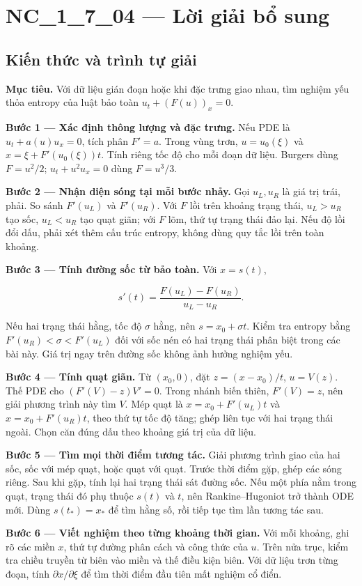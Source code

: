 \documentclass[10pt,a4paper]{article}
\begin{document}
\section*{NC\_1\_7\_04 — Lời giải bổ sung}
\subsection*{Kiến thức và trình tự giải}
\textbf{Mục tiêu.} Với dữ liệu gián đoạn hoặc khi đặc trưng giao nhau, tìm nghiệm yếu thỏa entropy của luật bảo toàn $u_t+(F(u))_x=0$.

\textbf{Bước 1 — Xác định thông lượng và đặc trưng.} Nếu PDE là $u_t+a(u)u_x=0$, tích phân $F'=a$. Trong vùng trơn, $u=u_0(\xi)$ và $x=\xi+F'(u_0(\xi))t$. Tính riêng tốc độ cho mỗi đoạn dữ liệu. Burgers dùng $F=u^2/2$; $u_t+u^2u_x=0$ dùng $F=u^3/3$.

\textbf{Bước 2 — Nhận diện sóng tại mỗi bước nhảy.} Gọi $u_L,u_R$ là giá trị trái, phải. So sánh $F'(u_L)$ và $F'(u_R)$. Với $F$ lồi trên khoảng trạng thái, $u_L>u_R$ tạo sốc, $u_L<u_R$ tạo quạt giãn; với $F$ lõm, thứ tự trạng thái đảo lại. Nếu độ lồi đổi dấu, phải xét thêm cấu trúc entropy, không dùng quy tắc lồi trên toàn khoảng.

\textbf{Bước 3 — Tính đường sốc từ bảo toàn.} Với $x=s(t)$,

\[
s'(t)=\frac{F(u_L)-F(u_R)}{u_L-u_R}.
\]

Nếu hai trạng thái hằng, tốc độ $\sigma$ hằng, nên $s=x_0+\sigma t$. Kiểm tra entropy bằng $F'(u_R)<\sigma<F'(u_L)$ đối với sốc nén có hai trạng thái phân biệt trong các bài này. Giá trị ngay trên đường sốc không ảnh hưởng nghiệm yếu.

\textbf{Bước 4 — Tính quạt giãn.} Từ $(x_0,0)$, đặt $z=(x-x_0)/t$, $u=V(z)$. Thế PDE cho $(F'(V)-z)V'=0$. Trong nhánh biến thiên, $F'(V)=z$, nên giải phương trình này tìm $V$. Mép quạt là $x=x_0+F'(u_L)t$ và $x=x_0+F'(u_R)t$, theo thứ tự tốc độ tăng; ghép liên tục với hai trạng thái ngoài. Chọn căn đúng dấu theo khoảng giá trị của dữ liệu.

\textbf{Bước 5 — Tìm mọi thời điểm tương tác.} Giải phương trình giao của hai sốc, sốc với mép quạt, hoặc quạt với quạt. Trước thời điểm gặp, ghép các sóng riêng. Sau khi gặp, tính lại hai trạng thái sát đường sốc. Nếu một phía nằm trong quạt, trạng thái đó phụ thuộc $s(t)$ và $t$, nên Rankine–Hugoniot trở thành ODE mới. Dùng $s(t_*)=x_*$ để tìm hằng số, rồi tiếp tục tìm lần tương tác sau.

\textbf{Bước 6 — Viết nghiệm theo từng khoảng thời gian.} Với mỗi khoảng, ghi rõ các miền $x$, thứ tự đường phân cách và công thức của $u$. Trên nửa trục, kiểm tra chiều truyền từ biên vào miền và thế điều kiện biên. Với dữ liệu trơn từng đoạn, tính $\partial x/\partial\xi$ để tìm thời điểm đầu tiên mất nghiệm cổ điển.
\end{document}
